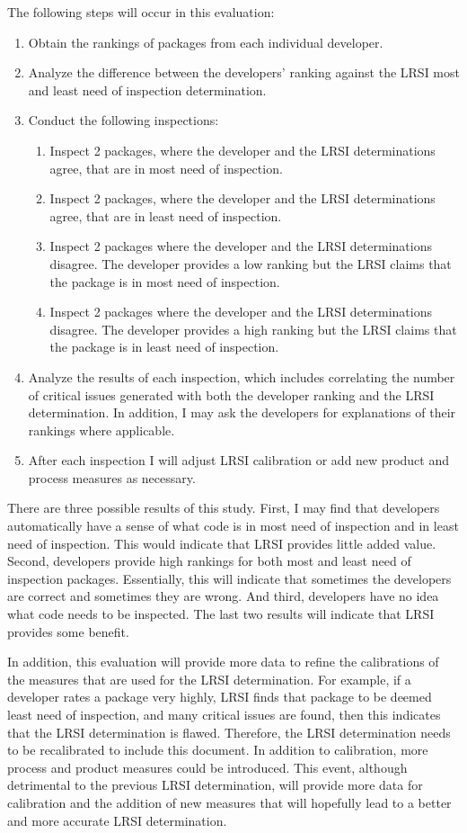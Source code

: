 The following steps will occur in this evaluation:
\begin{enumerate}
\item Obtain the rankings of packages from each individual developer.
\item Analyze the difference between the developers' ranking against the
  LRSI most and least need of inspection determination.
\item Conduct the following inspections: 
\begin{enumerate}
\item Inspect 2 packages, where the developer and the LRSI determinations
  agree, that are in most need of inspection.
\item Inspect 2 packages, where the developer and the LRSI determinations
  agree, that are in least need of inspection.
\item Inspect 2 packages where the developer and the LRSI determinations
  disagree. The developer provides a low ranking but the LRSI claims that
  the package is in most need of inspection.
\item Inspect 2 packages where the developer and the LRSI determinations
  disagree. The developer provides a high ranking but the LRSI claims that
  the package is in least need of inspection.
\end{enumerate}
\item Analyze the results of each inspection, which includes correlating
  the number of critical issues generated with both the developer ranking
  and the LRSI determination. In addition, I may ask the developers for
  explanations of their rankings where applicable.
\item After each inspection I will adjust LRSI calibration or add new
  product and process measures as necessary.
\end{enumerate}

There are three possible results of this study. First, I may find that
developers automatically have a sense of what code is in most need of
inspection and in least need of inspection. This would indicate that LRSI
provides little added value. Second, developers provide high rankings for
both most and least need of inspection packages. Essentially, this will
indicate that sometimes the developers are correct and sometimes they are
wrong. And third, developers have no idea what code needs to be
inspected. The last two results will indicate that LRSI provides some
benefit. 

In addition, this evaluation will provide more data to refine the
calibrations of the measures that are used for the LRSI determination. For
example, if a developer rates a package very highly, LRSI finds that
package to be deemed least need of inspection, and many critical issues are
found, then this indicates that the LRSI determination is flawed.
Therefore, the LRSI determination needs to be recalibrated to include this
document. In addition to calibration, more process and product measures
could be introduced. This event, although detrimental to the previous LRSI
determination, will provide more data for calibration and the addition of
new measures that will hopefully lead to a better and more accurate LRSI
determination.



